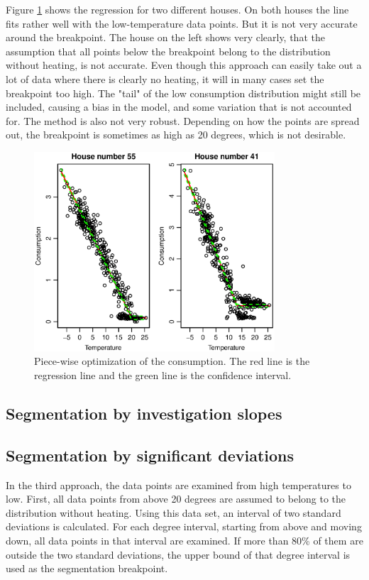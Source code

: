 \noindent Figure \ref{fig: Consumption-PW} shows the regression for two different houses. On both houses the
line fits rather well with the low-temperature data points. But it is not very accurate around the breakpoint.
The house on the left shows very clearly, that the assumption that all points below the breakpoint belong to 
the distribution without heating, is not accurate. Even though this approach can easily take out a lot of data
where there is clearly no heating, it will in many cases set the breakpoint too high. The "tail" of the low
consumption distribution might still be included, causing a bias in the model, and some variation that is not
accounted for. The method is also not very robust. Depending on how the points are spread out, the breakpoint
is sometimes as high as 20 degrees, which is not desirable.
\begin{figure}
    \centering
    \includegraphics[width=0.8\textwidth]{../../../figures/Consumption-PW.eps}
    \caption{Piece-wise optimization of the consumption. The red line is the regression line and the green line is the confidence interval.}
    \label{fig: Consumption-PW}
\end{figure}

\subsection{Segmentation by investigation slopes}


\subsection{Segmentation by significant deviations}
In the third approach, the data points are examined from high temperatures to low. First, all data points from
above 20 degrees are assumed to belong to the distribution without heating. Using this data set, an interval
of two standard deviations is calculated. For each degree interval, starting from above and moving down, all
data points in that interval are examined. If more than 80\% of them are outside the two standard deviations,
the upper bound of that degree interval is used as the segmentation breakpoint.


